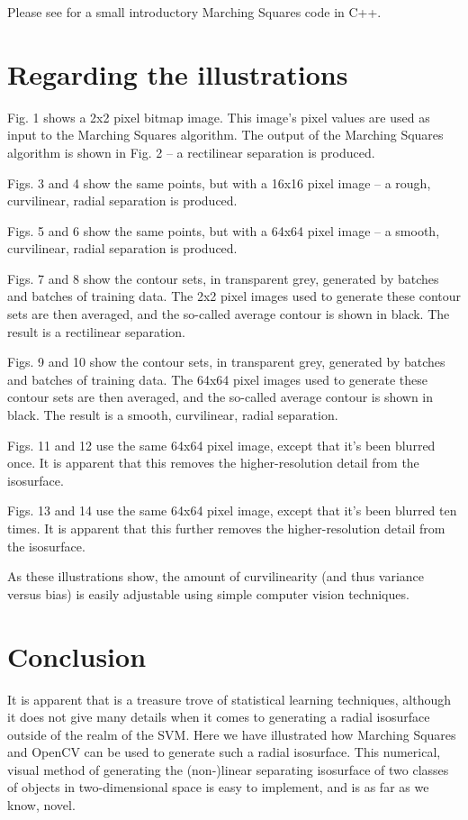 \documentclass[12pt]{article}
\begin{document}
Please see \cite{halayka} for a small introductory Marching Squares code in C++.





\section{Regarding the illustrations}

Fig. 1 shows a 2x2 pixel bitmap image.
This image's pixel values are used as input to the Marching Squares algorithm.
The output of the Marching Squares algorithm is shown in Fig. 2 -- a rectilinear separation is produced.

Figs. 3 and 4 show the same points, but with a 16x16 pixel image -- a rough, curvilinear, radial separation is produced.

Figs. 5 and 6 show the same points, but with a 64x64 pixel image -- a smooth, curvilinear, radial separation is produced.

Figs. 7 and 8 show the contour sets, in transparent grey, generated by batches and batches of training data.
The 2x2 pixel images used to generate these contour sets are then averaged, and the so-called average contour is shown in black.
The result is a rectilinear separation.

Figs. 9 and 10 show the contour sets, in transparent grey, generated by batches and batches of training data.
The 64x64 pixel images used to generate these contour sets are then averaged, and the so-called average contour is shown in black.
The result is a smooth, curvilinear, radial separation.

Figs. 11 and 12 use the same 64x64 pixel image, except that it's been blurred once.
It is apparent that this removes the higher-resolution detail from the isosurface.

Figs. 13 and 14 use the same 64x64 pixel image, except that it's been blurred ten times.
It is apparent that this further removes the higher-resolution detail from the isosurface.

As these illustrations show, the amount of curvilinearity (and thus variance versus bias) is easily adjustable using simple computer vision techniques.




\section{Conclusion}

It is apparent that \cite{james} is a treasure trove of statistical learning techniques, although it does not give many details when it comes to generating a radial isosurface outside of the realm of the SVM.
Here we have illustrated how Marching Squares and OpenCV can be used to generate such a radial isosurface.
This numerical, visual method of generating the (non-)linear separating isosurface of two classes of objects in two-dimensional space is easy to implement, and is as far as we know, novel.
\end{document}
